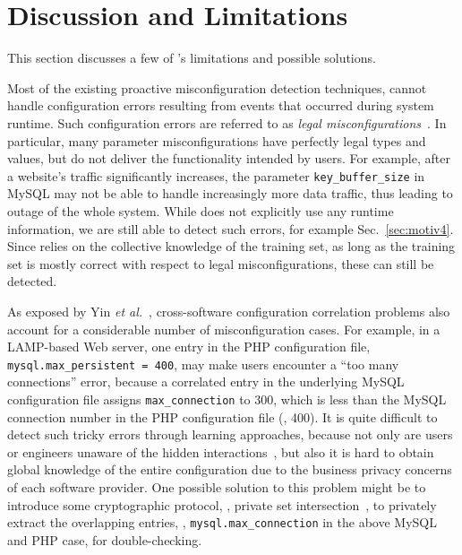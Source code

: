 
\section{Discussion and Limitations}

This section discusses a few of \app's limitations
and possible solutions.

Most of the existing proactive misconfiguration detection techniques, cannot handle configuration errors resulting from events that occurred during system runtime.
Such configuration errors are referred to as {\em legal misconfigurations}~\cite{yin11anempirical}. 
In particular, many parameter misconfigurations have perfectly legal types and values, but do not deliver the functionality intended by users. 
For example, after a website's traffic significantly increases, the parameter {\tt key\_buffer\_size} in MySQL may not  be able to handle increasingly more data traffic,
   thus leading to outage of the whole system.
While \app does not explicitly use any runtime information, we are still able to detect such errors, for example Sec.~\ref{sec:motiv4}.
Since \app relies on the collective knowledge of the training set, as long as the training set is mostly correct with respect to legal misconfigurations, these can still be detected.

As exposed by Yin {\em et al.}~\cite{yin11anempirical},
cross-software configuration correlation problems also account
for a considerable number of misconfiguration cases.
For example, in a LAMP-based Web server, one entry in the
PHP configuration file, {\tt mysql.max\_persistent = 400},
may make users encounter a ``too many connections'' error,
because a correlated entry in the underlying MySQL configuration
file assigns {\tt max\_connection} to 300, which is less
than the MySQL connection number in the PHP configuration file (\ie, 400).
It is quite difficult to detect such tricky errors
through learning approaches, because not only are users or engineers 
unaware of the hidden interactions~\cite{xu15systems},
but also it is hard to obtain global knowledge of the entire
configuration due to the business privacy concerns of
each software provider.
One possible solution to this problem might be to introduce
some cryptographic protocol, \eg, private set
intersection~\cite{kissner05privacy}, to privately extract the
overlapping entries, \eg, {\tt mysql.max\_connection} in the 
above MySQL and PHP case, for double-checking.

